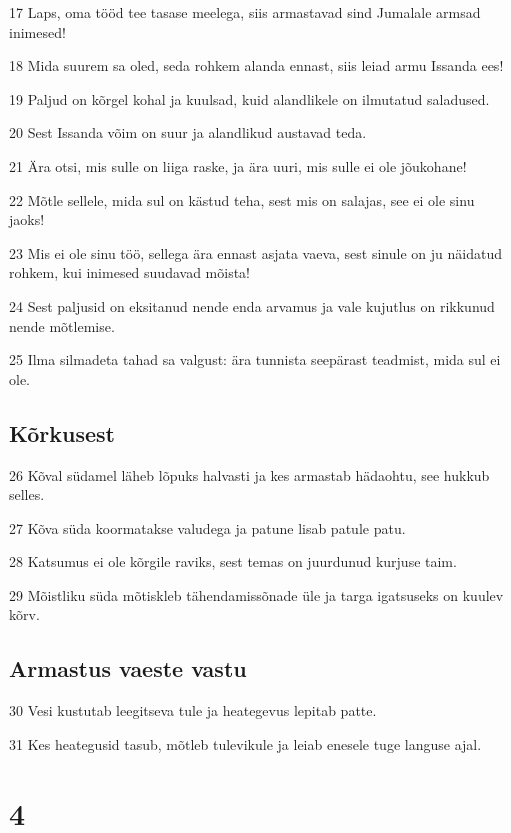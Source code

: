 \par 17 Laps, oma tööd tee tasase meelega, siis armastavad sind Jumalale armsad inimesed!
\par 18 Mida suurem sa oled, seda rohkem alanda ennast, siis leiad armu Issanda ees!
\par 19 Paljud on kõrgel kohal ja kuulsad, kuid alandlikele on ilmutatud saladused.
\par 20 Sest Issanda võim on suur ja alandlikud austavad teda.
\par 21 Ära otsi, mis sulle on liiga raske, ja ära uuri, mis sulle ei ole jõukohane!
\par 22 Mõtle sellele, mida sul on kästud teha, sest mis on salajas, see ei ole sinu jaoks!
\par 23 Mis ei ole sinu töö, sellega ära ennast asjata vaeva, sest sinule on ju näidatud rohkem, kui inimesed suudavad mõista!
\par 24 Sest paljusid on eksitanud nende enda arvamus ja vale kujutlus on rikkunud nende mõtlemise.
\par 25 Ilma silmadeta tahad sa valgust: ära tunnista seepärast teadmist, mida sul ei ole.

\section*{Kõrkusest}

\par 26 Kõval südamel läheb lõpuks halvasti ja kes armastab hädaohtu, see hukkub selles.
\par 27 Kõva süda koormatakse valudega ja patune lisab patule patu.
\par 28 Katsumus ei ole kõrgile raviks, sest temas on juurdunud kurjuse taim.
\par 29 Mõistliku süda mõtiskleb tähendamissõnade üle ja targa igatsuseks on kuulev kõrv.

\section*{Armastus vaeste vastu}

\par 30 Vesi kustutab leegitseva tule ja heategevus lepitab patte.
\par 31 Kes heategusid tasub, mõtleb tulevikule ja leiab enesele tuge languse ajal.

\chapter{4}

